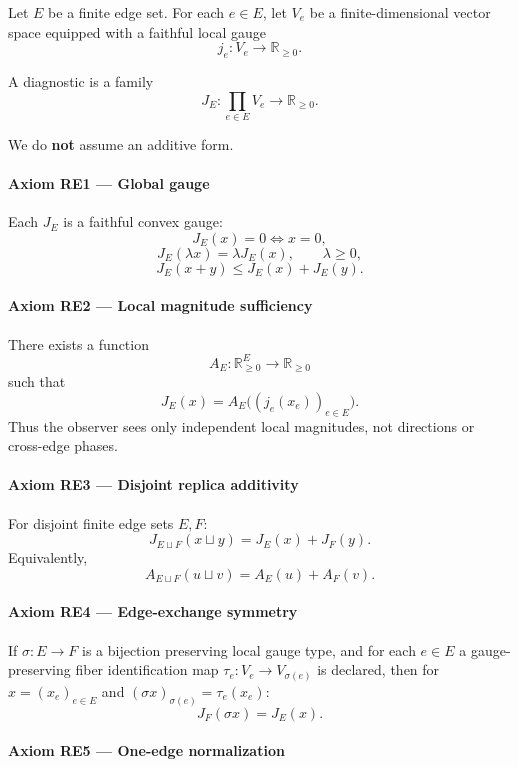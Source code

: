 \documentclass[
  11pt,
]{article}
\begin{document}
Let \(E\) be a finite edge set. For each \(e\in E\), let \(V_e\) be a finite-dimensional vector space equipped with a faithful local gauge
\[ j_e:V_e\to \mathbb R_{\ge 0}. \]

A diagnostic is a family
\[ J_E:\prod_{e\in E}V_e\to \mathbb R_{\ge 0}. \]

We do \textbf{not} assume an additive form.

\paragraph{Axiom RE1 --- Global gauge}\label{axiom-re1-global-gauge}

Each \(J_E\) is a faithful convex gauge:
\[ J_E(x)=0\iff x=0, \]
\[ J_E(\lambda x)=\lambda J_E(x),\qquad \lambda\ge0, \]
\[ J_E(x+y)\le J_E(x)+J_E(y). \]

\paragraph{Axiom RE2 --- Local magnitude sufficiency}\label{axiom-re2-local-magnitude-sufficiency}

There exists a function
\[ A_E:\mathbb R_{\ge0}^E\to\mathbb R_{\ge0} \]
such that
\[ J_E(x)=A_E\bigl((j_e(x_e))_{e\in E}\bigr). \]
Thus the observer sees only independent local magnitudes, not directions or cross-edge phases.

\paragraph{Axiom RE3 --- Disjoint replica additivity}\label{axiom-re3-disjoint-replica-additivity}

For disjoint finite edge sets \(E,F\):
\[ J_{E\sqcup F}(x\sqcup y)=J_E(x)+J_F(y). \]
Equivalently,
\[ A_{E\sqcup F}(u\sqcup v)=A_E(u)+A_F(v). \]

\paragraph{Axiom RE4 --- Edge-exchange symmetry}\label{axiom-re4-edge-exchange-symmetry}

If \(\sigma:E\to F\) is a bijection preserving local gauge type, and for each \(e\in E\) a gauge-preserving fiber identification map \(\tau_e:V_e\to V_{\sigma(e)}\) is declared, then for \(x=(x_e)_{e\in E}\) and \((\sigma x)_{\sigma(e)} = \tau_e(x_e)\):
\[ J_F(\sigma x)=J_E(x). \]

\paragraph{Axiom RE5 --- One-edge normalization}\label{axiom-re5-one-edge-normalization}
\end{document}
